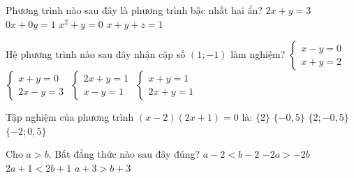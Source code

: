 

\begin{ex}%
	Phương trình nào sau đây là phương trình bậc nhất hai ẩn?
	\choice
	{\True $2x + y = 3$}
	{$0x + 0y = 1$}
	{$x^2 + y = 0$}
	{$x + y + z = 1$}
\end{ex}

\begin{ex}%
	Hệ phương trình nào sau đây nhận cặp số $(1; -1)$ làm nghiệm?
	\choice
	{$\begin{cases} x - y = 0 \\ x + y = 2 \end{cases}$}
	{\True $\begin{cases} x + y = 0 \\ 2x - y = 3 \end{cases}$}
	{$\begin{cases} 2x + y = 1 \\ x - y = 1 \end{cases}$}
	{$\begin{cases} x + y = 1 \\ 2x + y = 1 \end{cases}$}
\end{ex}

\begin{ex}%
	Tập nghiệm của phương trình $(x - 2)(2x + 1) = 0$ là:
	\choice
	{$\{2\}$}
	{$\{-0{,}5\}$}
	{\True $\{2; -0{,}5\}$}
	{$\{-2; 0{,}5\}$}
\end{ex}

\begin{ex}%
	Cho $a > b$. Bất đẳng thức nào sau đây đúng?
	\choice
	{$a - 2 < b - 2$}
	{$-2a > -2b$}
	{$2a + 1 < 2b + 1$}
	{\True $a + 3 > b + 3$}
\end{ex}

